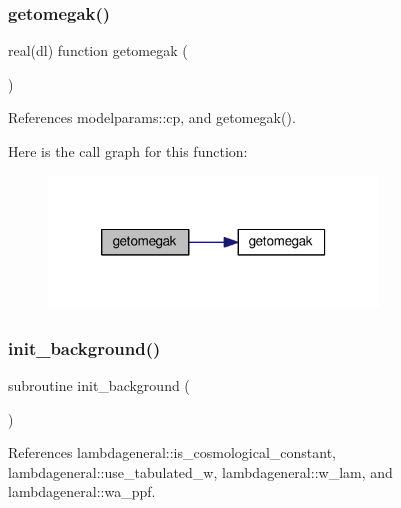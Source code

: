 \subsubsection{\texorpdfstring{getomegak()}{getomegak()}}
{\footnotesize\ttfamily real(dl) function getomegak (\begin{DoxyParamCaption}{ }\end{DoxyParamCaption})}



References modelparams\+::cp, and getomegak().

Here is the call graph for this function\+:
\nopagebreak
\begin{figure}[H]
\begin{center}
\leavevmode
\includegraphics[width=248pt]{equations__ppf_8f90_a2c95a3b42a68aa87a21097ce3ff8bbe6_cgraph}
\end{center}
\end{figure}
\mbox{\label{equations__ppf_8f90_a47540f6082acc64c78a1daac45637fd6}} 
\subsubsection{\texorpdfstring{init\+\_\+background()}{init\_background()}}
{\footnotesize\ttfamily subroutine init\+\_\+background (\begin{DoxyParamCaption}{ }\end{DoxyParamCaption})}



References lambdageneral\+::is\+\_\+cosmological\+\_\+constant, lambdageneral\+::use\+\_\+tabulated\+\_\+w, lambdageneral\+::w\+\_\+lam, and lambdageneral\+::wa\+\_\+ppf.

